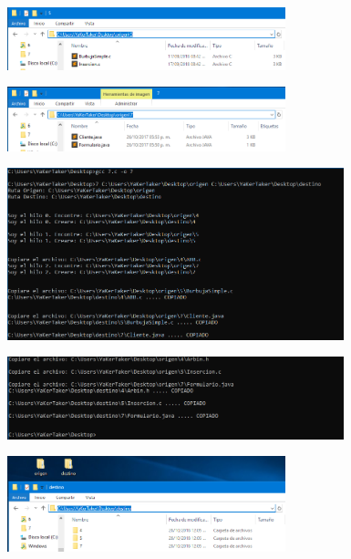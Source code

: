 \documentclass[12pt]{article}
\begin{document}
\begin{itemize}
			         \begin{figure}[h!]
			          \centering \includegraphics[width=0.72\textwidth]{Practica5/Images/windows/7_3.png}
			         \end{figure}
			         
			         \begin{figure}[h!]
			          \centering \includegraphics[width=0.72\textwidth]{Practica5/Images/windows/7_4.png}
			         \end{figure}
			         
			         \begin{figure}[h!]
			          \centering \includegraphics[width=0.87\textwidth]{Practica5/Images/windows/7_5.PNG}
			         \end{figure}
	                
	                 \begin{figure}[h!]
			          \centering \includegraphics[width=0.87\textwidth]{Practica5/Images/windows/7_6.PNG}
			         \end{figure}
			         
			          \begin{figure}[h!]
			          \centering \includegraphics[width=0.72\textwidth]{Practica5/Images/windows/7_7.png}
			         \end{figure}
			         

\end{itemize}
\end{document}
